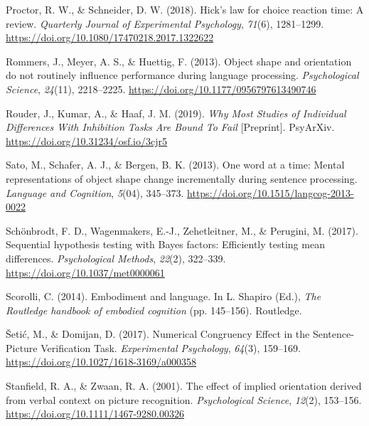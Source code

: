 \documentclass[
  man,floatsintext]{apa7}
\newlength{\cslhangindent}
\newlength{\cslentryspacingunit} %
\newenvironment{CSLReferences}[2] %
 {%
  \setlength{\parindent}{0pt}
  \ifodd #1
  \let\oldpar\par
  \def\par{\hangindent=\cslhangindent\oldpar}
  \fi
  \setlength{\parskip}{#2\cslentryspacingunit}
 }%
 {}
\begin{document}
\begin{CSLReferences}{1}{0}
\leavevmode{}%
Proctor, R. W., \& Schneider, D. W. (2018). Hick's law for choice reaction time: {A} review. \emph{Quarterly Journal of Experimental Psychology}, \emph{71}(6), 1281--1299. \url{https://doi.org/10.1080/17470218.2017.1322622}

\leavevmode{}%
Rommers, J., Meyer, A. S., \& Huettig, F. (2013). Object shape and orientation do not routinely influence performance during language processing. \emph{Psychological Science}, \emph{24}(11), 2218--2225. \url{https://doi.org/10.1177/0956797613490746}

\leavevmode{}%
Rouder, J., Kumar, A., \& Haaf, J. M. (2019). \emph{Why {Most Studies} of {Individual Differences With Inhibition Tasks Are Bound To Fail}} {[}Preprint{]}. {PsyArXiv}. \url{https://doi.org/10.31234/osf.io/3cjr5}

\leavevmode{}%
Sato, M., Schafer, A. J., \& Bergen, B. K. (2013). One word at a time: {Mental} representations of object shape change incrementally during sentence processing. \emph{Language and Cognition}, \emph{5}(04), 345--373. \url{https://doi.org/10.1515/langcog-2013-0022}

\leavevmode{}%
Schönbrodt, F. D., Wagenmakers, E.-J., Zehetleitner, M., \& Perugini, M. (2017). Sequential hypothesis testing with {Bayes} factors: {Efficiently} testing mean differences. \emph{Psychological Methods}, \emph{22}(2), 322--339. \url{https://doi.org/10.1037/met0000061}

\leavevmode{}%
Scorolli, C. (2014). Embodiment and language. In L. Shapiro (Ed.), \emph{The {Routledge} handbook of embodied cognition} (pp. 145--156). {Routledge}.

\leavevmode{}%
Šetić, M., \& Domijan, D. (2017). Numerical {Congruency Effect} in the {Sentence-Picture Verification Task}. \emph{Experimental Psychology}, \emph{64}(3), 159--169. \url{https://doi.org/10.1027/1618-3169/a000358}

\leavevmode{}%
Stanfield, R. A., \& Zwaan, R. A. (2001). The effect of implied orientation derived from verbal context on picture recognition. \emph{Psychological Science}, \emph{12}(2), 153--156. \url{https://doi.org/10.1111/1467-9280.00326}


\end{CSLReferences}
\end{document}
